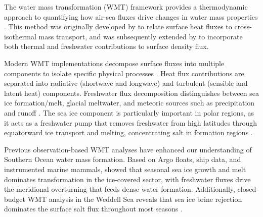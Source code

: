 \documentclass[draft]{agujournal2025}
\begin{document}

The water mass transformation (WMT) framework provides a thermodynamic approach to quantifying how air-sea fluxes drive changes in water mass properties \citep{Walin1982,Groeskamp2019,drake2025water}. This method was originally developed by \citet{Walin1982} to relate surface heat fluxes to cross-isothermal mass transport, and was subsequently extended by \citet{Speer1992} to incorporate both thermal and freshwater contributions to surface density flux.

Modern WMT implementations decompose surface fluxes into multiple components to isolate specific physical processes \citep{Iudicone2008a,Iudicone2008b}. Heat flux contributions are separated into radiative (shortwave and longwave) and turbulent (sensible and latent heat) components. Freshwater flux decomposition distinguishes between sea ice formation/melt, glacial meltwater, and meteoric sources such as precipitation and runoff \citep{Abernathey2016,Bailey2023}. The sea ice component is particularly important in polar regions, as it acts as a freshwater pump that removes freshwater from high latitudes through equatorward ice transport and melting, concentrating salt in formation regions \citep{Abernathey2016}.

Previous observation-based WMT analyses have enhanced our understanding of Southern Ocean water mass formation.  Based on Argo floats, ship data, and instrumented marine mammals,  \citet{Pellichero2018} showed that seasonal sea ice growth and melt dominates transformation in the ice-covered sector, with freshwater fluxes drive the meridional overturning that feeds dense water formation. Additionally, closed-budget WMT analysis in the Weddell Sea reveals that sea ice brine rejection dominates the surface salt flux throughout most seasons \citep{Bailey2023}.
\end{document}
